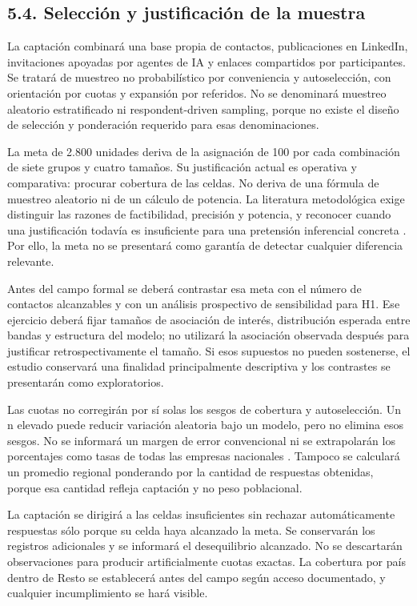 \documentclass[12pt,letterpaper]{article}
\begin{document}
\subsection*{5.4. Selección y justificación de la muestra}
La captación combinará una base propia de contactos, publicaciones en LinkedIn, invitaciones apoyadas por agentes de IA y enlaces compartidos por participantes. Se tratará de muestreo no probabilístico por conveniencia y autoselección, con orientación por cuotas y expansión por referidos. No se denominará muestreo aleatorio estratificado ni respondent-driven sampling, porque no existe el diseño de selección y ponderación requerido para esas denominaciones.

La meta de 2.800 unidades deriva de la asignación de 100 por cada combinación de siete grupos y cuatro tamaños. Su justificación actual es operativa y comparativa: procurar cobertura de las celdas. No deriva de una fórmula de muestreo aleatorio ni de un cálculo de potencia. La literatura metodológica exige distinguir las razones de factibilidad, precisión y potencia, y reconocer cuando una justificación todavía es insuficiente para una pretensión inferencial concreta \citep{lakens}. Por ello, la meta no se presentará como garantía de detectar cualquier diferencia relevante.

Antes del campo formal se deberá contrastar esa meta con el número de contactos alcanzables y con un análisis prospectivo de sensibilidad para H1. Ese ejercicio deberá fijar tamaños de asociación de interés, distribución esperada entre bandas y estructura del modelo; no utilizará la asociación observada después para justificar retrospectivamente el tamaño. Si esos supuestos no pueden sostenerse, el estudio conservará una finalidad principalmente descriptiva y los contrastes se presentarán como exploratorios.

Las cuotas no corregirán por sí solas los sesgos de cobertura y autoselección. Un n elevado puede reducir variación aleatoria bajo un modelo, pero no elimina esos sesgos. No se informará un margen de error convencional ni se extrapolarán los porcentajes como tasas de todas las empresas nacionales \citep{baker}. Tampoco se calculará un promedio regional ponderando por la cantidad de respuestas obtenidas, porque esa cantidad refleja captación y no peso poblacional.

La captación se dirigirá a las celdas insuficientes sin rechazar automáticamente respuestas sólo porque su celda haya alcanzado la meta. Se conservarán los registros adicionales y se informará el desequilibrio alcanzado. No se descartarán observaciones para producir artificialmente cuotas exactas. La cobertura por país dentro de Resto se establecerá antes del campo según acceso documentado, y cualquier incumplimiento se hará visible.
\end{document}
